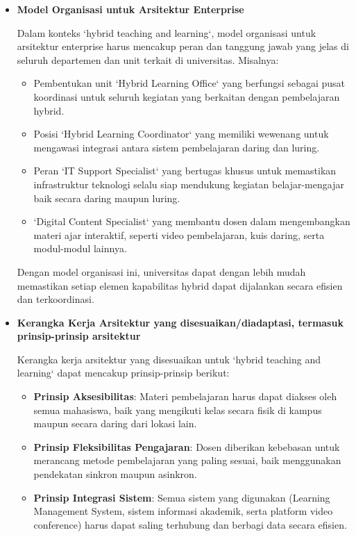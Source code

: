 \begin{itemize}
	\item \textbf{Model Organisasi untuk Arsitektur Enterprise}
	
	Dalam konteks `hybrid teaching and learning`, model organisasi untuk arsitektur enterprise harus mencakup peran dan tanggung jawab yang jelas di seluruh departemen dan unit terkait di universitas. Misalnya:
	\begin{itemize}
		\item Pembentukan unit `Hybrid Learning Office` yang berfungsi sebagai pusat koordinasi untuk seluruh kegiatan yang berkaitan dengan pembelajaran hybrid.
		\item Posisi `Hybrid Learning Coordinator` yang memiliki wewenang untuk mengawasi integrasi antara sistem pembelajaran daring dan luring.
		\item Peran `IT Support Specialist` yang bertugas khusus untuk memastikan infrastruktur teknologi selalu siap mendukung kegiatan belajar-mengajar baik secara daring maupun luring.
		\item `Digital Content Specialist` yang membantu dosen dalam mengembangkan materi ajar interaktif, seperti video pembelajaran, kuis daring, serta modul-modul lainnya.
	\end{itemize}
	
	Dengan model organisasi ini, universitas dapat dengan lebih mudah memastikan setiap elemen kapabilitas hybrid dapat dijalankan secara efisien dan terkoordinasi.
	
	\item \textbf{Kerangka Kerja Arsitektur yang disesuaikan/diadaptasi, termasuk prinsip-prinsip arsitektur}
	
	Kerangka kerja arsitektur yang disesuaikan untuk `hybrid teaching and learning` dapat mencakup prinsip-prinsip berikut:
	\begin{itemize}
		\item \textbf{Prinsip Aksesibilitas}: Materi pembelajaran harus dapat diakses oleh semua mahasiswa, baik yang mengikuti kelas secara fisik di kampus maupun secara daring dari lokasi lain.
		\item \textbf{Prinsip Fleksibilitas Pengajaran}: Dosen diberikan kebebasan untuk merancang metode pembelajaran yang paling sesuai, baik menggunakan pendekatan sinkron maupun asinkron.
		\item \textbf{Prinsip Integrasi Sistem}: Semua sistem yang digunakan (Learning Management System, sistem informasi akademik, serta platform video conference) harus dapat saling terhubung dan berbagi data secara efisien.
	\end{itemize}
	

\end{itemize}
